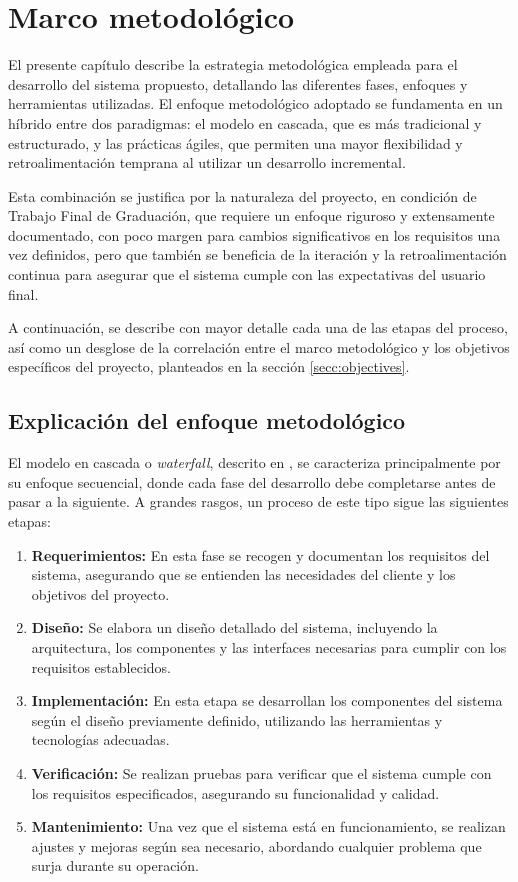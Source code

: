 \chapter{Marco metodológico}
\label{cap:metodologia}

El presente capítulo describe la estrategia metodológica empleada para el desarrollo del sistema propuesto, detallando las diferentes fases, enfoques y herramientas utilizadas. El enfoque metodológico adoptado se fundamenta en un híbrido entre dos paradigmas: el modelo en cascada, que es más tradicional y estructurado, y las prácticas ágiles, que permiten una mayor flexibilidad y retroalimentación temprana al utilizar un desarrollo incremental. 

Esta combinación se justifica por la naturaleza del proyecto, en condición de Trabajo Final de Graduación, que requiere un enfoque riguroso y extensamente documentado, con poco margen para cambios significativos en los requisitos una vez definidos, pero que también se beneficia de la iteración y la retroalimentación continua para asegurar que el sistema cumple con las expectativas del usuario final. 

A continuación, se describe con mayor detalle cada una de las etapas del proceso, así como un desglose de la correlación entre el marco metodológico y los objetivos específicos del proyecto, planteados en la sección \ref{secc:objectives}.


\section{Explicación del enfoque metodológico}

El modelo en cascada o \textit{waterfall}, descrito en \cite{royce_waterfall_1970}, se caracteriza principalmente por su enfoque secuencial, donde cada fase del desarrollo debe completarse antes de pasar a la siguiente. A grandes rasgos, un proceso de este tipo sigue las siguientes etapas:

\begin{enumerate}
    \item \textbf{Requerimientos:} En esta fase se recogen y documentan los requisitos del sistema, asegurando que se entienden las necesidades del cliente y los objetivos del proyecto.
    \item \textbf{Diseño:} Se elabora un diseño detallado del sistema, incluyendo la arquitectura, los componentes y las interfaces necesarias para cumplir con los requisitos establecidos.
    \item \textbf{Implementación:} En esta etapa se desarrollan los componentes del sistema según el diseño previamente definido, utilizando las herramientas y tecnologías adecuadas.
    \item \textbf{Verificación:} Se realizan pruebas para verificar que el sistema cumple con los requisitos especificados, asegurando su funcionalidad y calidad.
    \item \textbf{Mantenimiento:} Una vez que el sistema está en funcionamiento, se realizan ajustes y mejoras según sea necesario, abordando cualquier problema que surja durante su operación.
\end{enumerate}

